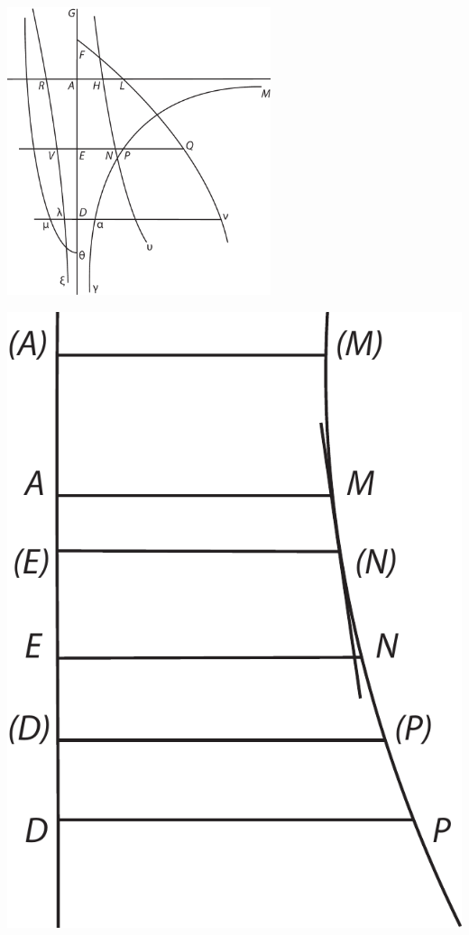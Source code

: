 \pend
\newpage%
\pstart
\noindent
\centering
\includegraphics[trim = 0mm -3mm 0mm 0mm, clip, width=0.58\textwidth]{images/LH037,04_061v-d3.pdf}\\
\noindent {}
\pend
\pstart
\vspace{1em}
\begin{minipage}[t]{0.345\textwidth}
\hspace*{-5mm}
\includegraphics[trim = 0mm -3mm 0mm 0mm, clip, width=1\textwidth]{images/LH037,04_061v-d4.pdf}
\noindent {}
\end{minipage}
